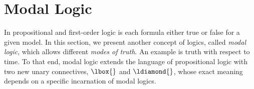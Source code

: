 







        
    \section{Modal Logic}
        \label{sec:modal-logic}

        In propositional and first-order logic is each formula either true or false for a given model.
        In this section, we present another concept of logics, called \emph{modal logic}, which allows different \emph{modes of truth}. An example is truth with respect to time.
        To that end, modal logic extends the language of propositional logic with two new unary connectives, $\lbox{}$ and $\ldiamond{}$, whose exact meaning depends on a specific incarnation of modal logics.

